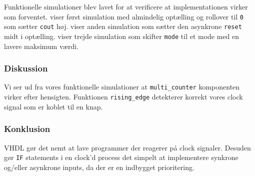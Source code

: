 {    

    Funktionelle simulationer blev lavet for at verificere at implementationen virker som forventet.
     viser først simulation med almindelig optælling og rollover til \texttt{0} som sætter \texttt{cout} høj.
     viser anden simulation som sætter den asynkrone \texttt{reset} midt i optælling.
     viser trejde simulation som skifter \texttt{mode} til et mode med en lavere maksimum værdi.


    \subsubsection{Diskussion}

    Vi ser ud fra vores funktionelle simulationer at \texttt{multi\_counter} komponenten virker efter hensigten.
    Funktionen \texttt{rising\_edge} detekterer korrekt vores clock signal som er koblet til en knap.

    \subsubsection{Konklusion}

    VHDL gør det nemt at lave programmer der reagerer på clock signaler.
    Desuden gør \texttt{IF} statements i en clock'd process det simpelt at implementere synkrone og/eller asynkrone inputs, da der er en indbygget prioritering.
}